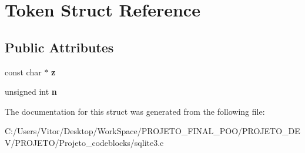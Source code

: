 \hypertarget{struct_token}{\section{Token Struct Reference}
\label{struct_token}
}
\subsection*{Public Attributes}
\begin{DoxyCompactItemize}
\item 
\hypertarget{struct_token_a57b502141e3018e4a02773424acb4ffd}{const char $\ast$ {\bfseries z}}\label{struct_token_a57b502141e3018e4a02773424acb4ffd}

\item 
\hypertarget{struct_token_ad8442439e00ab9713a9b91a53e44c2aa}{unsigned int {\bfseries n}}\label{struct_token_ad8442439e00ab9713a9b91a53e44c2aa}

\end{DoxyCompactItemize}


The documentation for this struct was generated from the following file\-:\begin{DoxyCompactItemize}
\item 
C\-:/\-Users/\-Vitor/\-Desktop/\-Work\-Space/\-P\-R\-O\-J\-E\-T\-O\-\_\-\-F\-I\-N\-A\-L\-\_\-\-P\-O\-O/\-P\-R\-O\-J\-E\-T\-O\-\_\-\-D\-E\-V/\-P\-R\-O\-J\-E\-T\-O/\-Projeto\-\_\-codeblocks/sqlite3.\-c\end{DoxyCompactItemize}
